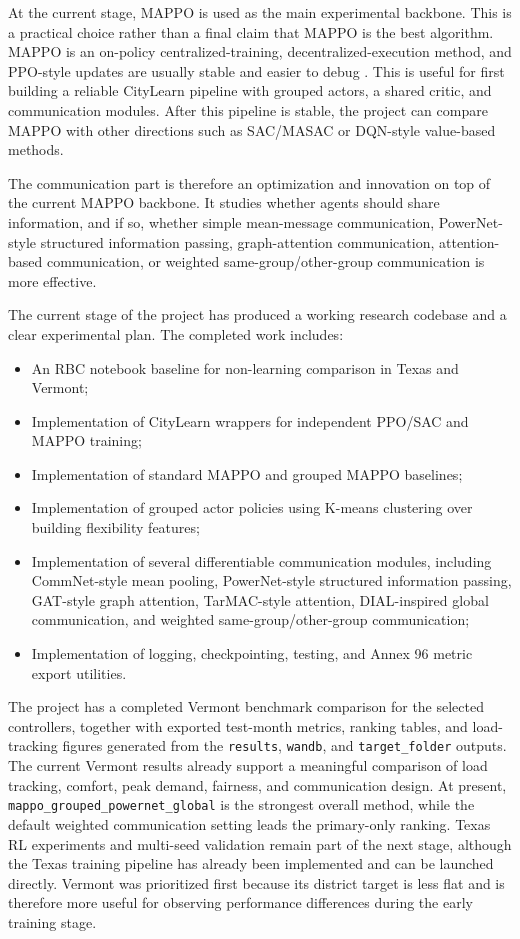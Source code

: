 At the current stage, MAPPO is used as the main experimental backbone. This is
a practical choice rather than a final claim that MAPPO is the best algorithm.
MAPPO is an on-policy centralized-training, decentralized-execution method, and
PPO-style updates are usually stable and easier to debug
\cite{ppo2017,mappo2022}. This is useful for first building a reliable
CityLearn pipeline with grouped actors, a shared critic, and communication
modules. After this pipeline is stable, the project can compare MAPPO with
other directions such as SAC/MASAC or DQN-style value-based methods.

The communication part is therefore an optimization and innovation on top of
the current MAPPO backbone. It studies whether agents should share information,
and if so, whether simple mean-message communication, PowerNet-style structured
information passing, graph-attention communication, attention-based
communication, or weighted same-group/other-group communication is more
effective.

The current stage of the project has produced a working research codebase and a
clear experimental plan. The completed work includes:

\begin{itemize}
  \item An RBC notebook baseline for non-learning comparison in Texas and
  Vermont;
  \item Implementation of CityLearn wrappers for independent PPO/SAC and MAPPO
  training;
  \item Implementation of standard MAPPO and grouped MAPPO baselines;
  \item Implementation of grouped actor policies using K-means clustering over
  building flexibility features;
  \item Implementation of several differentiable communication modules,
  including CommNet-style mean pooling, PowerNet-style structured information
  passing, GAT-style graph attention,
  TarMAC-style attention, DIAL-inspired global communication, and weighted
  same-group/other-group communication;
  \item Implementation of logging, checkpointing, testing, and Annex 96 metric
  export utilities.
\end{itemize}

The project has a completed Vermont benchmark comparison for the selected
controllers, together with exported test-month metrics, ranking tables, and
load-tracking figures generated from the \texttt{results}, \texttt{wandb}, and
\texttt{target\_folder} outputs. The current Vermont results already support a
meaningful comparison of load tracking, comfort, peak demand, fairness, and
communication design. At present, \texttt{mappo\_grouped\_powernet\_global} is
the strongest overall method, while the default weighted communication setting
leads the primary-only ranking. Texas RL experiments and multi-seed validation
remain part of the next stage, although the Texas training pipeline has already
been implemented and can be launched directly. Vermont was prioritized first
because its district target is less flat and is therefore more useful for
observing performance differences during the early training stage.


